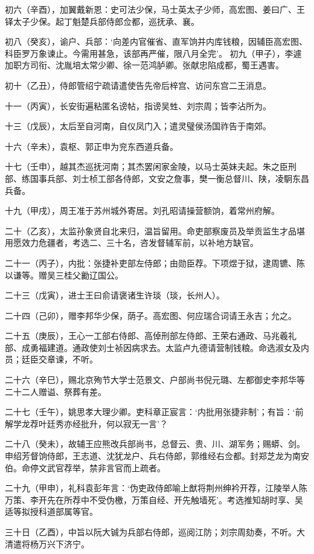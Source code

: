 \documentclass[]{article}
\begin{document}
初六（辛酉），加翼戴新恩：史可法少保，马士英太子少师，高宏图、姜曰广、王铎太子少保。起丁魁楚兵部侍郎佥都，巡抚承、襄。

初八（癸亥），谕户、兵部：`向差内官催省、直军饷并内库钱粮，因辅臣高宏图、科臣罗万象谏止。今需用甚急，该部再严催，限八月全完'。
初九（甲子），李遽加职方司衔、沈胤培太常少卿、徐一范鸿胪卿。张献忠陷成都，蜀王遇害。

初十（乙丑），侍郎管绍宁疏请遣使告先帝后梓宫、访问东宫二王消息。

十一（丙寅），长安街遍粘匿名谤帖，指谤吴甡、刘宗周；皆李沾所为。

十三（戊辰），太后至自河南，自仪凤门入；遣灵璧侯汤国祚告于南郊。

十六（辛未），袁枢、郭正申为兖东西道兵备。

十七（壬申），越其杰巡抚河南；其杰罢闲家金陵，以马士英妹夫起。朱之臣刑部、练国事兵部、刘士桢工部各侍郎，文安之詹事，樊一衡总督川、陕，凌駉东昌兵备。

十九（甲戌），周王准于苏州城外寄居。刘孔昭请操营额饷，着常州府解。

二十（乙亥），太监孙象贤自北来归，温旨留用。命吏部察废员及举贡监生才品堪用愿效力危疆者，考选二、三十名，咨发督辅军前，以补地方缺官。

二十一（丙子），内批：张捷补吏部左侍郎；由勋臣荐。下项煜于狱，逮周镳、陈以谦等。赠吴三桂父勷辽国公。

二十三（戊寅），进士王曰俞请褒诸生许琰（琰，长州人）。

二十四（己卯），赠李邦华少保，荫子。高宏图、何应瑞合词请王永吉；允之。

二十五（庚辰），王心一工部右侍郎、高倬刑部左侍郎、王荣右通政、马兆羲礼部、成勇福建道。通政使刘士祯因病求去。太监卢九德请营制钱粮。命选淑女及内员；廷臣交章谏，不听。

二十六（辛巳），赐北京殉节大学士范景文、户部尚书倪元璐、左都御史李邦华等二十二人赠谥、祭葬有差。

二十七（壬午），姚思孝大理少卿。吏科章正宸言：`内批用张捷非制'；有旨：`前解学龙荐叶廷秀亦经批升，何以寂无一言'？

二十八（癸未），故辅王应熊改兵部尚书，总督云、贵、川、湖军务；赐蟒、剑。申绍芳督饷侍郎，王志道、沈犹龙户、兵右侍郎，郭维经右佥都。封郑芝龙为南安伯。命停文武官荐举，禁非言官而上疏者。

二十九（甲申），礼科袁彭年言：`伪吏政侍郎喻上猷将荆州绅衿开荐，江陵举人陈万策、李开先在所荐中不受伪檄，万策自经、开先触墙死'。考选推知胡时享、吴适等拟授科道部属等官。

三十日（乙酉），中旨以阮大铖为兵部右侍郎，巡阅江防；刘宗周劾奏，不听。大清遣将杨万兴下济宁。
\end{document}

